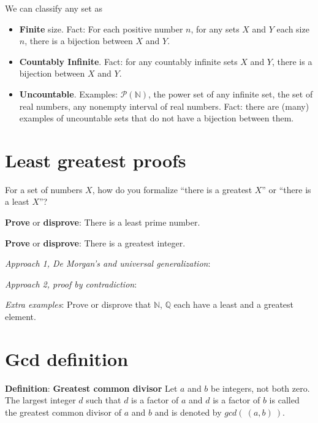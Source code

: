 \documentclass[12pt, oneside]{article}
\begin{document}
\vfill

We can classify any set as 
\begin{itemize}
\item {\bf Finite} size. Fact: For each positive number $n$, for any sets $X$ and $Y$ each 
size $n$, there is a bijection between $X$ and $Y$.
\item {\bf Countably Infinite}. Fact: for any countably infinite sets $X$ and $Y$, there is a bijection
between $X$ and $Y$.
\item {\bf Uncountable}. Examples: $\mathcal{P}(\mathbb{N})$, the power set of any infinite set, 
the set of real numbers, any nonempty interval of real numbers. Fact: there are (many) examples 
of uncountable sets that do not have a bijection between them.
\end{itemize} \vfill
\section*{Least greatest proofs}


For a set of numbers $X$, how do you formalize ``there is a greatest $X$'' 
or ``there is a least $X$''?

\vspace{30pt}

{\bf Prove} or {\bf  disprove}:  There is a least prime number.

\vspace{100pt}

{\bf Prove} or {\bf  disprove}: There is a greatest integer. 

{\it Approach 1, De Morgan's and universal generalization}: 

\vspace{100pt}

{\it Approach 2, proof by contradiction}: 

\vspace{200pt}

{\it Extra examples}: 
Prove or disprove that $\mathbb{N}$,  $\mathbb{Q}$ each have a
least and a greatest element. 
 \vfill
\section*{Gcd definition}


{\bf Definition}: {\bf Greatest common divisor} Let $a$ and $b$ be integers, not both zero. The largest integer $d$ such that 
$d$ is a  factor of $a$ and $d$ is a factor of  $b$ is called the greatest common divisor of $a$ and $b$ 
and is denoted by $gcd(~(a, b)~)$. \vfill
\end{document}
